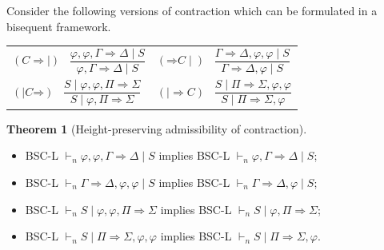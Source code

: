 \documentclass[10pt,a4paper]{article}
\theoremstyle{definition}
\newtheorem{theorem}{\textbf{Theorem}}
\newcommand{\3}{\vspace{.3in}}
\newcommand{\2}{\vspace{.2in}}
\newcommand{\1}{\vspace{.1in}}
\newcommand{\5}{\vspace{.05in}}
\begin{document}
Consider the following versions of contraction which can be formulated in a bisequent framework. 

\noindent\begin{tabular}{ll}	
	$(\mathord{C}\mathord{\Rightarrow\mid})$ \ $\dfrac{\varphi,\varphi,\Gamma
		\Rightarrow \Delta \mid S}{\varphi, \Gamma \Rightarrow \Delta \mid S}$ &
	$(\mathord{\Rightarrow}\mathord{C\mid})$ \ $\dfrac{\Gamma
		\Rightarrow \Delta, \varphi, \varphi \mid S}{\Gamma
		\Rightarrow \Delta, \varphi \mid S}$\\[16pt]
	
	$(\mathord{\mid C}\mathord{\Rightarrow})$ \ $\dfrac{S \mid\varphi,\varphi, \Pi\Rightarrow\Sigma}{S\mid \varphi, \Pi\Rightarrow\Sigma}$ &
	$(\mathord{\mid\Rightarrow}\mathord{C})$ \ $\dfrac{S \mid \Pi\Rightarrow\Sigma, \varphi, \varphi}{S \mid \Pi\Rightarrow\Sigma, \varphi}$\\[16pt]	
\end{tabular}
\begin{theorem}[Height-preserving admissibility of contraction]\label{Contraction}
	$  $
\begin{itemize}\itemsep=0pt
\item	BSC-L $ \vdash_n\varphi,\varphi,\Gamma
\Rightarrow \Delta \mid S $ implies BSC-L $ \vdash_n\varphi,\Gamma
\Rightarrow \Delta \mid S $;
\item BSC-L $ \vdash_n\Gamma
\Rightarrow \Delta,\varphi,\varphi \mid S $ implies BSC-L $ \vdash_n\Gamma
\Rightarrow \Delta,\varphi \mid S $;
\item BSC-L $\vdash_nS \mid\varphi,\varphi, \Pi\Rightarrow\Sigma $ implies BSC-L $\vdash_nS \mid\varphi, \Pi\Rightarrow\Sigma $;
\item BSC-L $\vdash_nS \mid \Pi\Rightarrow\Sigma,\varphi,\varphi $ implies BSC-L $\vdash_nS \mid\Pi\Rightarrow\Sigma,\varphi $.
\end{itemize}
\end{theorem}
\end{document}
